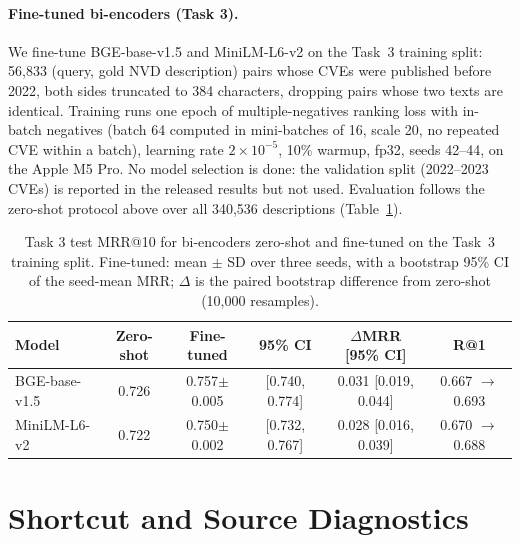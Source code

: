 \documentclass{article}
\begin{document}
\paragraph{Fine-tuned bi-encoders (Task 3).}
We fine-tune BGE-base-v1.5 and MiniLM-L6-v2 on the Task~3 training split: 56,833 (query, gold NVD description) pairs whose CVEs were published before 2022, both sides truncated to 384 characters, dropping pairs whose two texts are identical. Training runs one epoch of multiple-negatives ranking loss with in-batch negatives (batch 64 computed in mini-batches of 16, scale 20, no repeated CVE within a batch), learning rate $2\times10^{-5}$, 10\% warmup, fp32, seeds 42--44, on the Apple M5 Pro. No model selection is done: the validation split (2022--2023 CVEs) is reported in the released results but not used. Evaluation follows the zero-shot protocol above over all 340,536 descriptions (Table~\ref{tab:b6}).

\begin{table}[ht]
\centering
\small
\setlength{\tabcolsep}{4pt}
\caption{Task 3 test MRR@10 for bi-encoders zero-shot and fine-tuned on the Task~3 training split. Fine-tuned: mean $\pm$ SD over three seeds, with a bootstrap 95\% CI of the seed-mean MRR; $\Delta$ is the paired bootstrap difference from zero-shot (10,000 resamples).}
\label{tab:b6}
\begin{tabular}{lccccc}
\toprule
\textbf{Model} & \textbf{Zero-shot} & \textbf{Fine-tuned} & \textbf{95\% CI} & \textbf{$\Delta$MRR [95\% CI]} & \textbf{R@1} \\
\midrule
BGE-base-v1.5 & 0.726 & 0.757{\scriptsize$\pm$0.005} & [0.740, 0.774] & 0.031 [0.019, 0.044] & 0.667 $\to$ 0.693 \\
MiniLM-L6-v2 & 0.722 & 0.750{\scriptsize$\pm$0.002} & [0.732, 0.767] & 0.028 [0.016, 0.039] & 0.670 $\to$ 0.688 \\
\bottomrule
\end{tabular}
\end{table}

\section{Shortcut and Source Diagnostics}
\label{app:shortcuts}
\end{document}
